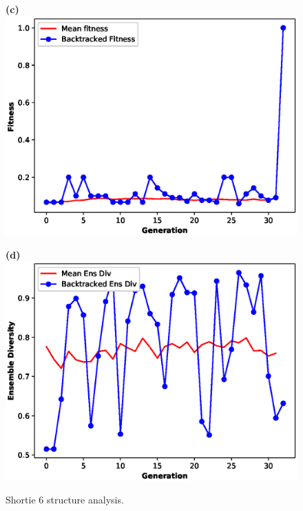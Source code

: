 \documentclass[english,12pt,a4paper]{article}
\theoremstyle{definition}
\begin{document}
\begin{figure}[H]
	\hspace{-1.2cm}
	\begin{minipage}{0.60\textwidth}
		\centering
		\textbf{(c)}\label{Fig:small3}
		\includegraphics[width=.9\linewidth]{images/stat3-65}
	\end{minipage}\hfill
	\begin{minipage}{0.6\textwidth}
		\centering
		
		\textbf{(d)}\label{Fig:small4}
		\includegraphics[width=.9\linewidth]{images/stat2-65}
	\end{minipage}
	
	\caption{Shortie 6 structure analysis.}\label{Fig:MED1}
	
\end{figure}
\medskip
\small
\end{document}

